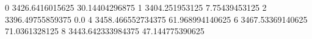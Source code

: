 0 3426.6416015625 30.14404296875
1 3404.251953125 7.75439453125
2 3396.49755859375 0.0
4 3458.466552734375 61.968994140625
6 3467.53369140625 71.0361328125
8 3443.642333984375 47.144775390625
